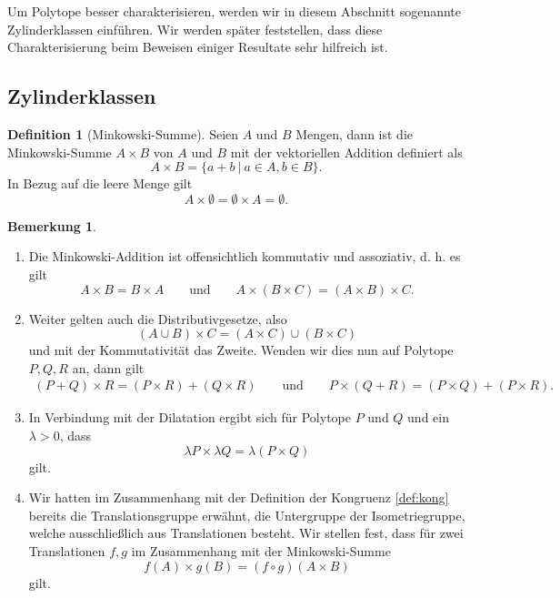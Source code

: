 \documentclass[11pt,titlepage]{article}
\theoremstyle{definition}
\newtheorem{definition}[theorem]{Definition}
\newtheorem{remark}[theorem]{Bemerkung}
\theoremstyle{remark}
\begin{document}
	Um Polytope besser charakterisieren, werden wir in diesem Abschnitt 
	sogenannte Zylinderklassen einführen. Wir werden später feststellen, 
	dass diese Charakterisierung beim Beweisen einiger Resultate sehr 
	hilfreich ist.

	\subsection{Zylinderklassen}
	
	\begin{definition}[Minkowski-Summe]
		Seien $A$ und $B$ Mengen, dann ist die Minkowski-Summe $A\times B$ 
		von $A$ und $B$ mit der vektoriellen Addition definiert als
		\[A\times B=\left.\{a+b\ \right\vert\ a\in A,b\in B\}.\]
		In Bezug auf die leere Menge gilt
		\[A\times \emptyset =\emptyset\times A=\emptyset.\]
	\end{definition}
	
	\begin{remark} \label{bem:mink}
		\begin{enumerate}
			Seien $A,B,C$ Mengen dann ergeben sich folgende Eigenschaften 
			mit der Minkowski-Summe.
			\item Die Minkowski-Addition ist offensichtlich kommutativ und assoziativ, d. h. 
			es gilt
			\[A\times B=B\times A\qquad\text{und}\qquad A\times(B\times C)=(A\times B)\times C.\]
			
			\item \label{bem:mink;3} 
			Weiter gelten auch die Distributivgesetze, also 
			\[(A\cup B)\times C=(A\times C)\cup (B\times C)\]
			und mit der Kommutativität das Zweite. Wenden wir dies nun auf Polytope 
			$P,Q,R$ an, dann gilt
			\begin{align}
			(P+Q)\times R =(P\times R)+(Q\times R)\qquad\text{und}\qquad
			P\times (Q+R)=(P\times Q)+(P\times R).
			\end{align}
			\item \label{bem:mink;1}In Verbindung mit der Dilatation ergibt sich für Polytope 
			$P$ und $Q$ und ein $\lambda>0$, dass
			\[\lambda P\times \lambda Q=\lambda(P\times Q)\]
			gilt.
			\item \label{bem:mink;2} 
			Wir hatten im Zusammenhang mit der Definition der 
			Kongruenz \ref{def:kong} bereits die Translationsgruppe 
			erwähnt, die Untergruppe der Isometriegruppe, welche ausschließlich 
			aus Translationen besteht. Wir stellen fest, dass für zwei 
			Translationen $f,g$ im Zusammenhang mit der Minkowski-Summe 
			\[f(A)\times g(B)=(f\circ g)(A\times B)\]
			gilt.
		\end{enumerate}
	\end{remark}
	
\end{document}
